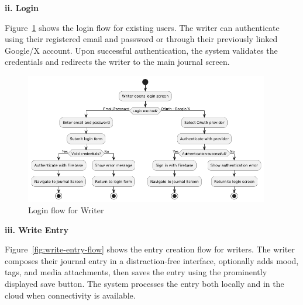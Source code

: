 \textbf{ii. Login}

Figure~\ref{fig:login-flow} shows the login flow for existing users. The writer can authenticate using their registered email and password or through their previously linked Google/X account. Upon successful authentication, the system validates the credentials and redirects the writer to the main journal screen.

\begin{figure}[H]
\centering
\includegraphics[width=0.95\textwidth,height=0.7\textheight,keepaspectratio]{files/imgs/login_flow.png}
\caption{Login flow for Writer}
\label{fig:login-flow}
\end{figure}
\clearpage

\textbf{iii. Write Entry}

Figure~\ref{fig:write-entry-flow} shows the entry creation flow for writers. The writer composes their journal entry in a distraction-free interface, optionally adds mood, tags, and media attachments, then saves the entry using the prominently displayed save button. The system processes the entry both locally and in the cloud when connectivity is available.

